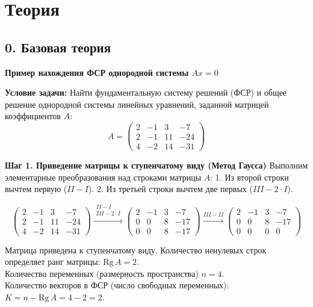 \section*{Теория}

\subsection*{0. Базовая теория}

\noindent\textbf{Пример нахождения ФСР однородной системы $Ax = 0$}

\noindent\textbf{Условие задачи:}
Найти фундаментальную систему решений (ФСР) и общее решение однородной системы линейных уравнений, заданной матрицей коэффициентов $A$:
\[
A = \begin{pmatrix}
2 & -1 & 3 & -7 \\
2 & -1 & 11 & -24 \\
4 & -2 & 14 & -31
\end{pmatrix}
\]

\noindent\textbf{Шаг 1. Приведение матрицы к ступенчатому виду (Метод Гаусса)}
Выполним элементарные преобразования над строками матрицы $A$:
1. Из второй строки вычтем первую ($II - I$).
2. Из третьей строки вычтем две первых ($III - 2\cdot I$).

\[
\begin{pmatrix}
2 & -1 & 3 & -7 \\
2 & -1 & 11 & -24 \\
4 & -2 & 14 & -31
\end{pmatrix}
\xrightarrow{\substack{II - I \\ III - 2\cdot I}}
\begin{pmatrix}
2 & -1 & 3 & -7 \\
0 &  0 & 8 & -17 \\
0 &  0 & 8 & -17
\end{pmatrix}
\xrightarrow{III - II}
\begin{pmatrix}
2 & -1 & 3 & -7 \\
0 &  0 & 8 & -17 \\
0 &  0 & 0 &  0
\end{pmatrix}
\]

Матрица приведена к ступенчатому виду. Количество ненулевых строк определяет ранг матрицы: $\mathrm{Rg}\,A = 2$. \\
Количество переменных (размерность пространства) $n = 4$. \\
Количество векторов в ФСР (число свободных переменных): $K = n - \mathrm{Rg}\,A = 4 - 2 = 2$.


